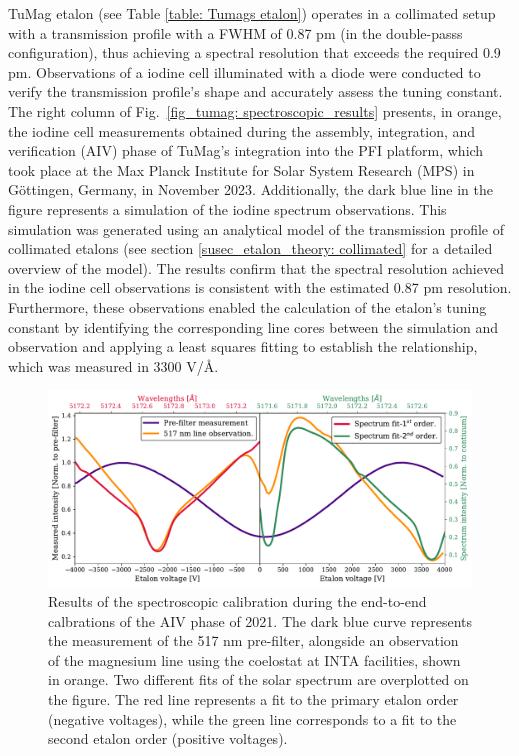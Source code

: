 TuMag etalon (see Table \ref{table: Tumags etalon}) operates in a collimated setup with a transmission profile with a FWHM of 0.87 pm (in the double-passs configuration), thus achieving a spectral resolution that exceeds the required 0.9 pm. Observations of a iodine cell illuminated with a diode were conducted to verify the transmission profile's shape and accurately assess the tuning constant. The right column of Fig.~\ref{fig_tumag: spectroscopic_results} presents, in orange, the iodine cell measurements obtained during the assembly, integration, and verification (AIV) phase of TuMag's integration into the PFI platform, which took place at the Max Planck Institute for Solar System Research (MPS) in Göttingen, Germany, in November 2023. Additionally, the dark blue line in the figure represents a simulation of the iodine spectrum observations. This simulation was generated using an analytical model of the transmission profile of collimated etalons (see section \ref{susec_etalon_theory: collimated} for a detailed overview of the model). The results confirm that the spectral resolution achieved in the iodine cell observations is consistent with the estimated 0.87 pm resolution. Furthermore, these observations enabled the calculation of the etalon's tuning constant by identifying the corresponding line cores between the simulation and observation and applying a least squares fitting to establish the relationship, which was measured in 3300 V/\r{A}.

\begin{figure}[t]
    \includegraphics[width=\textwidth]{figures/TuMag/secondorder.pdf}
    \caption[Etalon's second order in magnesium measurements.]{
      Results of the spectroscopic calibration during the end-to-end calbrations of the AIV phase of 2021. The dark blue curve represents the measurement of the 517 nm pre-filter, alongside an observation of the magnesium line using the coelostat at INTA facilities, shown in orange. Two different fits of the solar spectrum are overplotted on the figure. The red line represents a fit to the primary etalon order (negative voltages), while the green line corresponds to a fit to the second etalon order (positive voltages).      
      \label{fig_tumag:second-order_cont}}
\end{figure}

